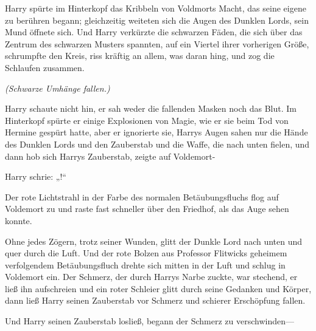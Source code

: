 Harry spürte im Hinterkopf das Kribbeln von Voldmorts Macht, das seine eigene zu berühren begann; gleichzeitig weiteten sich die Augen des Dunklen Lords, sein Mund öffnete sich.
Und Harry verkürzte die schwarzen Fäden, die sich über das Zentrum des schwarzen Musters spannten, auf ein Viertel ihrer vorherigen Größe, schrumpfte den Kreis, riss kräftig an allem, was daran hing, und zog die Schlaufen zusammen.

\emph{(Schwarze Umhänge fallen.)}

Harry schaute nicht hin, er sah weder die fallenden Masken noch das Blut. Im Hinterkopf spürte er einige Explosionen von Magie, wie er sie beim Tod von Hermine gespürt hatte, aber er ignorierte sie, Harrys Augen sahen nur die Hände des Dunklen Lords und den Zauberstab und die Waffe, die nach unten fielen, und dann hob sich Harrys Zauberstab, zeigte auf Voldemort-

Harry schrie: „!“

Der rote Lichtstrahl in der Farbe des normalen Betäubungsfluchs flog auf Voldemort zu und raste fast schneller über den Friedhof, als das Auge sehen konnte.

Ohne jedes Zögern, trotz seiner Wunden, glitt der Dunkle Lord nach unten und quer durch die Luft. Und der rote Bolzen aus Professor Flitwicks geheimem verfolgendem Betäubungsfluch drehte sich mitten in der Luft und schlug in Voldemort ein.
Der Schmerz, der durch Harrys Narbe zuckte, war stechend, er ließ ihn aufschreien und ein roter Schleier glitt durch seine Gedanken und Körper, dann ließ Harry seinen Zauberstab vor Schmerz und schierer Erschöpfung fallen.

Und Harry seinen Zauberstab losließ, begann der Schmerz zu verschwinden—

